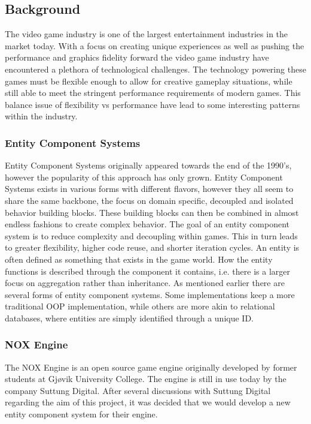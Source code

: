 \subsection{Background}
The video game industry is one of the largest entertainment industries in the market today. 
With a focus on creating unique experiences as well as pushing the performance and graphics fidelity
forward the video game industry have encountered a plethora of technological challenges.
The technology powering these games must be flexible enough to allow for creative gameplay situations, 
while still able to meet the stringent performance requirements of modern games.
This balance issue of flexibility vs performance have lead to some interesting patterns within the industry.

\subsubsection{Entity Component Systems}
Entity Component Systems originally appeared towards the end of the 1990's, 
however the popularity of this approach has only grown. 
\cite{wikipedia_ecs_history}
Entity Component Systems exists in various forms with different flavors,
however they all seem to share the same backbone, the focus on domain specific, 
decoupled and isolated behavior building blocks.
These building blocks can then be combined in almost endless fashions to create complex behavior. 
The goal of an entity component system is to reduce complexity and decoupling within games. 
This in turn leads to greater flexibility, higher code reuse, and shorter iteration cycles. 
An entity is often defined as something that exists in the game world. 
How the entity functions is described through the component it contains, 
i.e. there is a larger focus on aggregation rather than inheritance. 
\cite[components]{game_programming_patterns}
As mentioned earlier there are several forms of entity component systems. 
Some implementations keep a more traditional OOP implementation, 
\cite[components]{game_programming_patterns}
while others are more akin to relational databases, 
where entities are simply identified through a unique ID. 
\cite{t_machine_ecs_are_the_future_p2} 

\subsubsection{NOX Engine}
The NOX Engine is an open source game engine originally developed by former students at Gj{\o}vik University College.
The engine is still in use today by the company Suttung Digital. 
After several discussions with Suttung Digital regarding the aim of this project, 
it was decided that we would develop a new entity component system for their engine. 